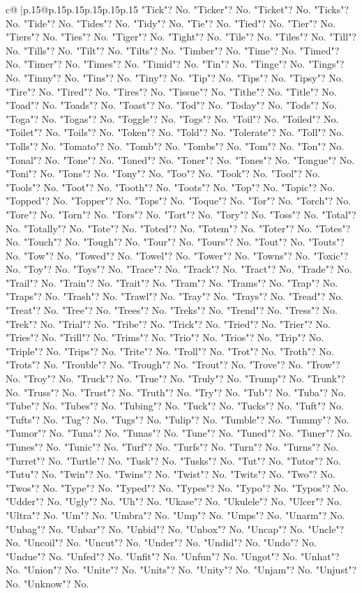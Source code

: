 \documentclass{article}
\begin{document}
{\begin{supertabular}{c@{$\;$}|p{.15\linewidth}@{}p{.15\linewidth}p{.15\linewidth}p{.15\linewidth}p{.15\linewidth}p{.15\linewidth}}
{{{"Tick"? No. "Ticker"? No. "Ticket"? No. "Ticks"? No. "Tide"? No. "Tides"? No. "Tidy"? No. "Tie"? No. "Tied"? No. "Tier"? No. "Tiers"? No. "Ties"? No. "Tiger"? No. "Tight"? No. "Tile"? No. "Tiles"? No. "Till"? No. "Tills"? No. "Tilt"? No. "Tilts"? No. "Timber"? No. "Time"? No. "Timed"? No. "Timer"? No. "Times"? No. "Timid"? No. "Tin"? No. "Tinge"? No. "Tings"? No. "Tinny"? No. "Tins"? No. "Tiny"? No. "Tip"? No. "Tips"? No. "Tipsy"? No. "Tire"? No. "Tired"? No. "Tires"? No. "Tissue"? No. "Tithe"? No. "Title"? No. "Toad"? No. "Toads"? No. "Toast"? No. "Tod"? No. "Today"? No. "Tods"? No. "Toga"? No. "Togas"? No. "Toggle"? No. "Togs"? No. "Toil"? No. "Toiled"? No. "Toilet"? No. "Toils"? No. "Token"? No. "Told"? No. "Tolerate"? No. "Toll"? No. "Tolls"? No. "Tomato"? No. "Tomb"? No. "Tombs"? No. "Tom"? No. "Ton"? No. "Tonal"? No. "Tone"? No. "Toned"? No. "Toner"? No. "Tones"? No. "Tongue"? No. "Toni"? No. "Tons"? No. "Tony"? No. "Too"? No. "Took"? No. "Tool"? No. "Tools"? No. "Toot"? No. "Tooth"? No. "Toots"? No. "Top"? No. "Topic"? No. "Topped"? No. "Topper"? No. "Tops"? No. "Toque"? No. "Tor"? No. "Torch"? No. "Tore"? No. "Torn"? No. "Tors"? No. "Tort"? No. "Tory"? No. "Toss"? No. "Total"? No. "Totally"? No. "Tote"? No. "Toted"? No. "Totem"? No. "Toter"? No. "Totes"? No. "Touch"? No. "Tough"? No. "Tour"? No. "Tours"? No. "Tout"? No. "Touts"? No. "Tow"? No. "Towed"? No. "Towel"? No. "Tower"? No. "Towns"? No. "Toxic"? No. "Toy"? No. "Toys"? No. "Trace"? No. "Track"? No. "Tract"? No. "Trade"? No. "Trail"? No. "Train"? No. "Trait"? No. "Tram"? No. "Trams"? No. "Trap"? No. "Traps"? No. "Trash"? No. "Trawl"? No. "Tray"? No. "Trays"? No. "Tread"? No. "Treat"? No. "Tree"? No. "Trees"? No. "Treks"? No. "Trend"? No. "Tress"? No. "Trek"? No. "Trial"? No. "Tribe"? No. "Trick"? No. "Tried"? No. "Trier"? No. "Tries"? No. "Trill"? No. "Trims"? No. "Trio"? No. "Trios"? No. "Trip"? No. "Triple"? No. "Trips"? No. "Trite"? No. "Troll"? No. "Trot"? No. "Troth"? No. "Trots"? No. "Trouble"? No. "Trough"? No. "Trout"? No. "Trove"? No. "Trow"? No. "Troy"? No. "Truck"? No. "True"? No. "Truly"? No. "Trump"? No. "Trunk"? No. "Truss"? No. "Trust"? No. "Truth"? No. "Try"? No. "Tub"? No. "Tuba"? No. "Tube"? No. "Tubes"? No. "Tubing"? No. "Tuck"? No. "Tucks"? No. "Tuft"? No. "Tufts"? No. "Tug"? No. "Tugs"? No. "Tulip"? No. "Tumble"? No. "Tummy"? No. "Tumor"? No. "Tuna"? No. "Tunas"? No. "Tune"? No. "Tuned"? No. "Tuner"? No. "Tunes"? No. "Tunic"? No. "Turf"? No. "Turfs"? No. "Turn"? No. "Turns"? No. "Turret"? No. "Turtle"? No. "Tusk"? No. "Tusks"? No. "Tut"? No. "Tutor"? No. "Tutu"? No. "Twin"? No. "Twins"? No. "Twist"? No. "Twits"? No. "Two"? No. "Twos"? No. "Type"? No. "Typed"? No. "Types"? No. "Typo"? No. "Typos"? No. "Udder"? No. "Ugly"? No. "Uh"? No. "Ukase"? No. "Ukulele"? No. "Ulcer"? No. "Ultra"? No. "Um"? No. "Umbra"? No. "Ump"? No. "Umps"? No. "Unarm"? No. "Unbag"? No. "Unbar"? No. "Unbid"? No. "Unbox"? No. "Uncap"? No. "Uncle"? No. "Uncoil"? No. "Uncut"? No. "Under"? No. "Undid"? No. "Undo"? No. "Undue"? No. "Unfed"? No. "Unfit"? No. "Unfun"? No. "Ungot"? No. "Unhat"? No. "Union"? No. "Unite"? No. "Units"? No. "Unity"? No. "Unjam"? No. "Unjust"? No. "Unknow"? No. }}}
\end{supertabular}}
\end{document}
